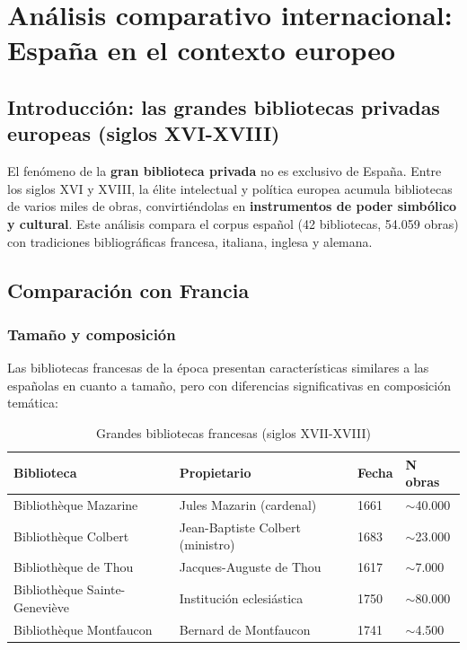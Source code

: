\documentclass[11pt,a4paper]{article}
\begin{document}
\section{Análisis comparativo internacional: España en el contexto europeo}

\subsection{Introducción: las grandes bibliotecas privadas europeas (siglos XVI-XVIII)}

El fenómeno de la \textbf{gran biblioteca privada} no es exclusivo de España. Entre los siglos XVI y XVIII, la élite intelectual y política europea acumula bibliotecas de varios miles de obras, convirtiéndolas en \textbf{instrumentos de poder simbólico y cultural}. Este análisis compara el corpus español (42 bibliotecas, 54.059 obras) con tradiciones bibliográficas francesa, italiana, inglesa y alemana.

\subsection{Comparación con Francia}

\subsubsection{Tamaño y composición}

Las bibliotecas francesas de la época presentan características similares a las españolas en cuanto a tamaño, pero con diferencias significativas en composición temática:

\begin{table}[h]
\centering
\begin{tabular}{llll}
\toprule
\textbf{Biblioteca} & \textbf{Propietario} & \textbf{Fecha} & \textbf{N obras} \\
\midrule
Bibliothèque Mazarine & Jules Mazarin (cardenal) & 1661 & $\sim$40.000 \\
Bibliothèque Colbert & Jean-Baptiste Colbert (ministro) & 1683 & $\sim$23.000 \\
Bibliothèque de Thou & Jacques-Auguste de Thou & 1617 & $\sim$7.000 \\
Bibliothèque Sainte-Geneviève & Institución eclesiástica & 1750 & $\sim$80.000 \\
Bibliothèque Montfaucon & Bernard de Montfaucon & 1741 & $\sim$4.500 \\
\bottomrule
\end{tabular}
\caption{Grandes bibliotecas francesas (siglos XVII-XVIII)}
\end{table}
\end{document}
